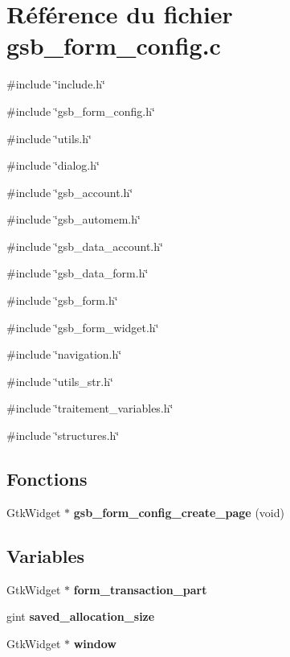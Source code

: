 \section{Référence du fichier gsb\_\-form\_\-config.c}
\label{gsb__form__config_8c}
{\ttfamily \#include \char`\"{}include.h\char`\"{}}\par
{\ttfamily \#include \char`\"{}gsb\_\-form\_\-config.h\char`\"{}}\par
{\ttfamily \#include \char`\"{}utils.h\char`\"{}}\par
{\ttfamily \#include \char`\"{}dialog.h\char`\"{}}\par
{\ttfamily \#include \char`\"{}gsb\_\-account.h\char`\"{}}\par
{\ttfamily \#include \char`\"{}gsb\_\-automem.h\char`\"{}}\par
{\ttfamily \#include \char`\"{}gsb\_\-data\_\-account.h\char`\"{}}\par
{\ttfamily \#include \char`\"{}gsb\_\-data\_\-form.h\char`\"{}}\par
{\ttfamily \#include \char`\"{}gsb\_\-form.h\char`\"{}}\par
{\ttfamily \#include \char`\"{}gsb\_\-form\_\-widget.h\char`\"{}}\par
{\ttfamily \#include \char`\"{}navigation.h\char`\"{}}\par
{\ttfamily \#include \char`\"{}utils\_\-str.h\char`\"{}}\par
{\ttfamily \#include \char`\"{}traitement\_\-variables.h\char`\"{}}\par
{\ttfamily \#include \char`\"{}structures.h\char`\"{}}\par
\subsection*{Fonctions}
\begin{DoxyCompactItemize}
\item 
GtkWidget $\ast$ {\bf gsb\_\-form\_\-config\_\-create\_\-page} (void)
\end{DoxyCompactItemize}
\subsection*{Variables}
\begin{DoxyCompactItemize}
\item 
GtkWidget $\ast$ {\bf form\_\-transaction\_\-part}
\item 
gint {\bf saved\_\-allocation\_\-size}
\item 
GtkWidget $\ast$ {\bf window}
\end{DoxyCompactItemize}


